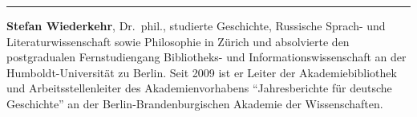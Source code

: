 \begin{center}\rule{3in}{0.4pt}\end{center}

\textbf{Stefan Wiederkehr}, Dr.~phil., studierte Geschichte, Russische
Sprach- und Literaturwissenschaft sowie Philosophie in Zürich und
absolvierte den postgradualen Fernstudiengang Bibliotheks- und
Informationswissenschaft an der Humboldt-Universität zu Berlin. Seit
2009 ist er Leiter der Akademiebibliothek und Arbeitsstellenleiter des
Akademienvorhabens ``Jahresberichte für deutsche Geschichte'' an der
Berlin-Brandenburgischen Akademie der Wissenschaften.
